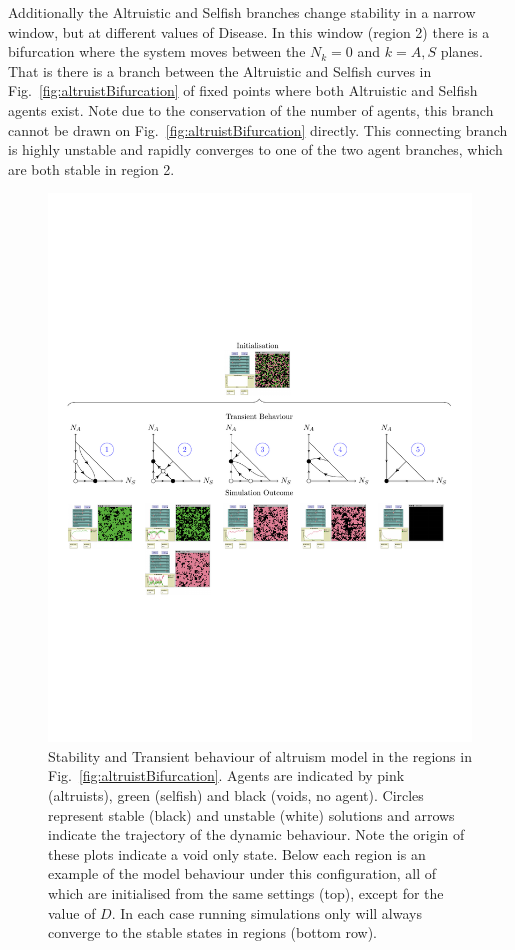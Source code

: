\documentclass[11pt]{article}
\begin{document}
	Additionally the Altruistic and Selfish branches change stability in a narrow window, but at different values of Disease. In this window (region 2) there is a bifurcation where the system moves between the $N_k=0$ and $k=A,S$ planes. That is there is a branch between the Altruistic and Selfish curves in Fig.~\ref{fig:altruistBifurcation} of fixed points where both Altruistic and Selfish agents exist. Note due to the conservation of the number of agents, this branch cannot be drawn on Fig.~\ref{fig:altruistBifurcation} directly. This connecting branch is highly unstable and rapidly converges to one of the two agent branches, which are both stable in region 2. 
	
\begin{figure}[t]
	\centering 
		\includegraphics[width=0.9\linewidth, trim=1cm 7cm 1cm 7cm, clip=true]{AltruismSimulations}		
	\caption{Stability and Transient behaviour of altruism model in the regions in Fig.~\ref{fig:altruistBifurcation}. Agents are indicated by pink (altruists), green (selfish) and black (voids, no agent). Circles represent stable (black) and unstable (white) solutions and arrows indicate the trajectory of the dynamic behaviour. Note the origin of these plots indicate a void only state. Below each region is an example of the model behaviour under this configuration, all of which are initialised from the same settings (top), except for the value of $D$. In each case running simulations only will always converge to the stable states in regions (bottom row).  \label{fig:altruistStabillity}}
\end{figure}		
	
\end{document}
